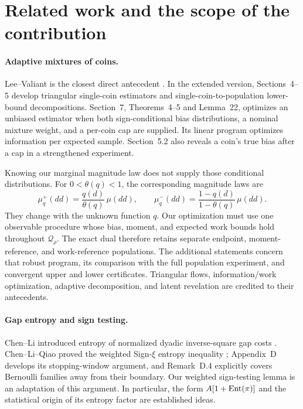 \section{Related work and the scope of the contribution}
\label{sec:related-work}

\paragraph{Adaptive mixtures of coins.}
Lee--Valiant is the closest direct antecedent \cite{lv}. In the extended
version, Sections~4--5 develop triangular single-coin estimators and
single-coin-to-population lower-bound decompositions. Section~7,
Theorems~4--5 and Lemma~22, optimizes an unbiased estimator when both
sign-conditional bias distributions, a nominal mixture weight, and a
per-coin cap are supplied. Its linear program optimizes information per
expected sample. Section~5.2 also reveals a coin's true bias after a cap
in a strengthened experiment.

Knowing our marginal magnitude law does not supply those conditional
distributions. For $0<\theta(q)<1$, the corresponding magnitude laws are
\[
 \mu_q^+(dd)=\frac{q(d)}{\theta(q)}\,\mu(dd),\qquad
 \mu_q^-(dd)=\frac{1-q(d)}{1-\theta(q)}\,\mu(dd).
\]
They change with the unknown function $q$. Our optimization must use one
observable procedure whose bias, moment, and expected work bounds hold
throughout $\mathcal Q_\rho$. The exact dual therefore retains separate
endpoint, moment-reference, and work-reference populations. The
additional statements concern that robust program, its comparison with
the full population experiment, and convergent upper and lower
certificates. Triangular flows, information/work optimization, adaptive
decomposition, and latent revelation are credited to their antecedents.

\paragraph{Gap entropy and sign testing.}
Chen--Li introduced entropy of normalized dyadic inverse-square gap
costs \cite[Definition~3.3]{cl16}. Chen--Li--Qiao proved the weighted
Sign-$\xi$ entropy inequality \cite[Lemma~4.1]{clq}; Appendix~D develops
its stopping-window argument, and Remark~D.4 explicitly covers Bernoulli
families away from their boundary. Our weighted sign-testing lemma is
an adaptation of this argument. In particular, the form
$A[1+\operatorname{Ent}(\pi)]$ and the statistical origin of its entropy factor are
established ideas.

